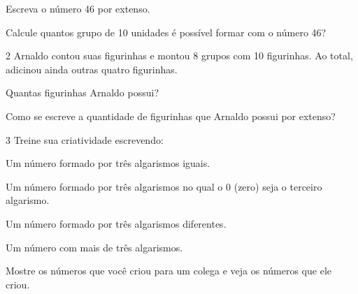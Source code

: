 \begin{escolha}
\item
  Escreva o número 46 por extenso.

\item
  Calcule quantos grupo de 10 unidades é possível formar com o número 46?
\end{escolha}

\num{2} Arnaldo contou suas figurinhas e montou 8 grupos com 10 figurinhas. Ao total, adicinou ainda outras quatro figurinhas.

\begin{escolha}
\item
  Quantas figurinhas Arnaldo possui?\\

\item  Como se escreve a quantidade de figurinhas que Arnaldo possui por extenso?\\
\end{escolha}

\num{3} Treine sua criatividade escrevendo:

\begin{escolha}
\item Um número formado por três algarismos iguais.\\

\item Um número formado por três algarismos no qual o 0 (zero) seja o terceiro algarismo.\\

\item Um número formado por três algarismos diferentes.\\

\item Um número com mais de três algarismos.\\

\item Mostre os números que você criou para um colega e veja os números que ele criou.
\end{escolha}

